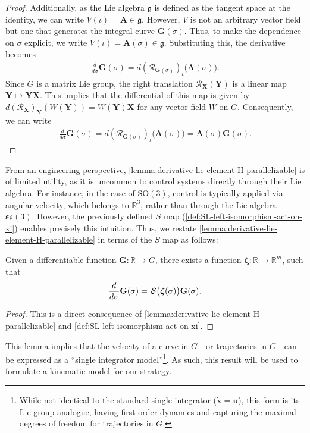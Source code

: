 \begin{proof}
    Additionally, as the Lie algebra $\mathfrak{g}$ is defined as the tangent space at the identity, we can write $V(\iota) = \mathbf{A} \in \mathfrak{g}$. However, $V$ is not an arbitrary vector field but one that generates the integral curve $\mathbf{G}(\sigma)$. Thus, to make the dependence on $\sigma$ explicit, we write $V(\iota) = \mathbf{A}(\sigma) \in \mathfrak{g}$. Substituting this, the derivative becomes
    \begin{align}
        \frac{d}{d\sigma} \mathbf{G}(\sigma) = d(\mathcal{R}_{\mathbf{G}(\sigma)})_{\iota}\bigl(\mathbf{A}(\sigma)\bigr).
    \end{align}
    Since $G$ is a matrix Lie group, the right translation $\mathcal{R}_\mathbf{X}(\mathbf{Y})$ is a linear map $\mathbf{Y}\mapsto \mathbf{Y}\mathbf{X}$. This implies that the differential of this map is given by $d(\mathcal{R}_\mathbf{X})_{\mathbf{Y}}(W(\mathbf{Y})) = W(\mathbf{Y})\mathbf{X}$ \citep[p. 194]{Lee2012} for any vector field $W$ on $G$. Consequently, we can write
    \begin{align}
        \frac{d}{d\sigma} \mathbf{G}(\sigma) = d(\mathcal{R}_{\mathbf{G}(\sigma)})_{\iota}\bigl(\mathbf{A}(\sigma)\bigr) = \mathbf{A}(\sigma)\mathbf{G}(\sigma).
    \end{align}
\end{proof}

From an engineering perspective, \cref{lemma:derivative-lie-element-H-parallelizable} is of limited utility, as it is uncommon to control systems directly through their Lie algebra. For instance, in the case of $\text{SO}(3)$, control is typically applied via angular velocity, which belongs to $\mathbb{R}^3$, rather than through the Lie algebra $\mathfrak{so}(3)$. However, the previously defined $S$ map (\cref{def:SL-left-isomorphism-act-on-xi}) enables precisely this intuition. Thus, we restate \cref{lemma:derivative-lie-element-H-parallelizable} in terms of the $S$ map as follows:
\begin{lemma} \label{lemma:very-important-fact}
    Given a differentiable function $\mathbf{\mathbf{G}}:\mathbb{R}\to G$, there exists a function $\boldsymbol{\zeta}:\mathbb{R}\to\mathbb{R}^m$, such that
    \begin{align}
    \label{eq:importantresult}
    \frac{d}{d\sigma} \mathbf{\mathbf{G}}(\sigma)=\SL\bigl(\boldsymbol{\zeta}(\sigma)\bigr)\mathbf{\mathbf{G}}(\sigma). 
\end{align}
\end{lemma}
\begin{proof} This is a direct consequence of \cref{lemma:derivative-lie-element-H-parallelizable} and \cref{def:SL-left-isomorphism-act-on-xi}. 
\end{proof}
This lemma implies that the velocity of a curve in $G$---or trajectories in $G$---can be expressed as a ``single integrator model''\footnote{While not identical to the standard single integrator ($\dot{\mathbf{x}} = \mathbf{u}$), this form is its Lie group analogue, having first order dynamics and capturing the maximal degrees of freedom for trajectories in $G$.}. As such, this result will be used to formulate a kinematic model for our strategy.
